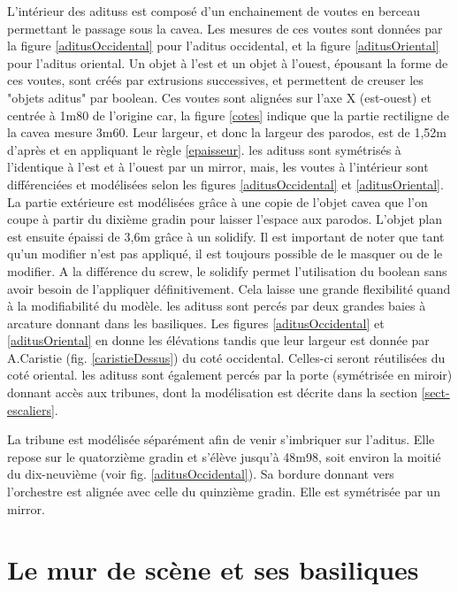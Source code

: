 L'intérieur des \glspl{aditus} est composé d'un enchainement de voutes en berceau permettant le passage sous la \gls{cavea}. Les mesures de ces voutes sont données par la figure \ref{aditusOccidental} pour l'\gls{aditus} occidental, et la figure \ref{aditusOriental} pour l'\gls{aditus} oriental. Un objet à l'est et un objet à l'ouest, épousant la forme de ces voutes, sont créés par extrusions successives, et permettent de creuser les "objets aditus" par \gls{boolean}. Ces voutes sont alignées sur l'axe X (est-ouest) et centrée à 1m80 de l'origine car, la figure \ref{cotes} indique que la partie rectiligne de la \gls{cavea} mesure 3m60. Leur largeur, et donc la largeur des \gls{parodos}, est de 1,52m d'après \cite[Pl. XXI]{orangePl} et en appliquant le règle \ref{epaisseur}. les \glspl{aditus} sont symétrisés à l'identique à l'est et à l'ouest par un \gls{mirror}, mais, les voutes à l'intérieur sont différenciées et modélisées selon les figures \ref{aditusOccidental} et \ref{aditusOriental}. La partie extérieure est modélisées grâce à une copie de l'objet \gls{cavea} que l'on coupe à partir du dixième gradin pour laisser l'espace aux \gls{parodos}. L'objet plan est ensuite épaissi de 3,6m grâce à un \gls{solidify}. Il est important de noter que tant qu'un \gls{modifier} n'est pas appliqué, il est toujours possible de le masquer ou de le modifier. A la différence du \gls{screw}, le \gls{solidify} permet l'utilisation du \gls{boolean} sans avoir besoin de l'appliquer définitivement. Cela laisse une grande flexibilité quand à la modifiabilité du modèle. les \glspl{aditus} sont percés par deux grandes baies à arcature donnant dans les basiliques. Les figures \ref{aditusOccidental} et \ref{aditusOriental} en donne les élévations tandis que leur largeur est donnée par A.Caristie (fig. \ref{caristieDessus}) du coté occidental. Celles-ci seront réutilisées du coté oriental. les \glspl{aditus} sont également percés par la porte (symétrisée en miroir) donnant accès aux tribunes, dont la modélisation est décrite dans la section \ref{sect-escaliers}.

La tribune est modélisée séparément afin de venir s'imbriquer sur l'\gls{aditus}. Elle repose sur le quatorzième gradin et s'élève jusqu'à 48m98, soit environ la moitié du dix-neuvième (voir fig. \ref{aditusOccidental}). Sa bordure donnant vers l'orchestre est alignée avec celle du quinzième gradin. Elle est symétrisée par un \gls{mirror}.

\section{Le mur de scène et ses \glspl{basilique}} 
\label{mur}


